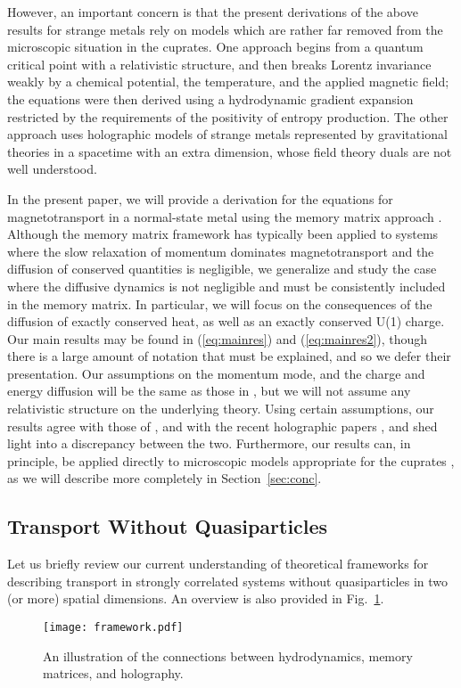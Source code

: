 \documentclass[10pt, oneside]{book}
\begin{document}
\begin{doublespace}
However, an important concern is that
the present derivations of the above results for strange metals rely on models which are rather
far removed from the microscopic situation in the cuprates. One approach \cite{hkms} begins from a quantum critical point with a relativistic structure, 
and then breaks Lorentz invariance weakly by a chemical potential, the temperature, and the applied magnetic field; the equations were then
derived using a hydrodynamic gradient expansion restricted by the requirements of the positivity of entropy production. The other approach \cite{hkms,Blake:2014yla} uses holographic models of strange metals represented by gravitational theories in a spacetime with an extra dimension, 
whose field theory duals are not well understood.

In the present paper, we will provide a derivation for the equations for magnetotransport in a normal-state metal using the memory matrix approach \cite{zwanzig,mori,forster1995}.    
Although the memory matrix framework has typically been applied to systems where the slow relaxation of momentum dominates magnetotransport and the diffusion of conserved quantities is negligible, we generalize and study the case where the diffusive dynamics is not negligible and must be consistently included in the memory matrix.    In particular, we will focus on the consequences of the diffusion of exactly conserved heat, as well as an exactly conserved U(1) charge.  Our main results may be found in (\ref{eq:mainres}) and (\ref{eq:mainres2}), though there is a large amount of notation that must be explained, and so we defer their presentation.   
Our assumptions on the momentum mode, and the charge and energy diffusion will be the same as those in \cite{hkms}, but we will not assume any relativistic
structure on the underlying theory.   Using certain assumptions, our results agree with those of \cite{hkms}, and with the recent holographic papers \cite{Amoretti:2015gna, Blake:2015ina, Kim:2015wba}, and shed light into a  discrepancy between the two.   Furthermore, our results can, in principle, be applied directly to microscopic models appropriate for the cuprates \cite{Hartnoll:2014gba,Patel:2014jfa,DHSS15,strack1}, as we will describe more completely in Section~\ref{sec:conc}.

\subsection{Transport Without Quasiparticles}
Let us briefly review our current understanding of theoretical frameworks for describing transport in strongly correlated systems without quasiparticles 
in two (or more) spatial dimensions.
An overview is also provided in Fig.~\ref{fig:framework}.
\begin{figure}
\begin{center}
\texttt{[image: framework.pdf]}
\end{center}
\caption{An illustration of the connections between hydrodynamics, memory matrices, and holography.}
\label{fig:framework}
\end{figure}



\end{doublespace}
\end{document}
